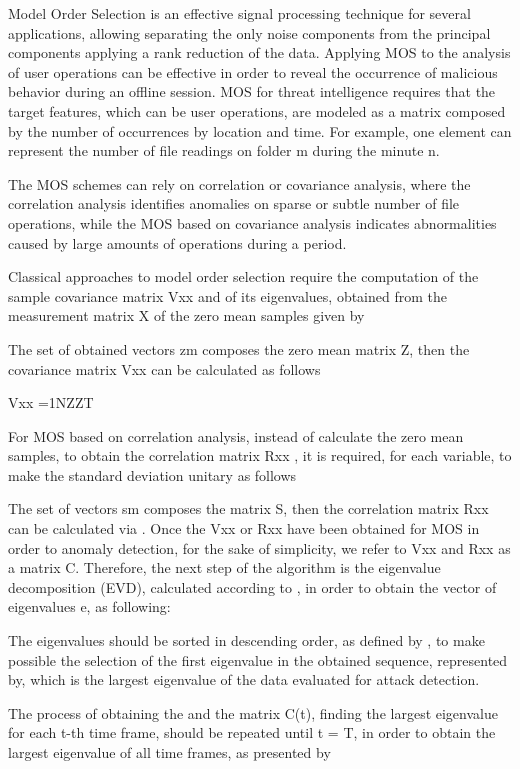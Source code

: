 \documentclass[twocolumn]{svjour3}          %
\begin{document}
Model Order Selection is an effective signal processing technique for several applications, allowing separating the only noise components from the principal components applying a rank reduction of the data. Applying MOS to the analysis of user operations can be effective in order to reveal the occurrence of malicious behavior during an offline session. MOS for threat intelligence requires that the target features, which can be user operations, are modeled as a matrix composed by the number of occurrences by location and time. For example, one element can represent the number of file readings on folder m during the minute n.

The MOS schemes can rely on correlation or covariance analysis, where the correlation analysis identifies anomalies on sparse or subtle number of file operations, while the MOS based on covariance analysis indicates abnormalities caused by large amounts of operations during a period.

Classical approaches to model order selection require the computation of the sample covariance matrix Vxx and of its eigenvalues, obtained from the measurement matrix X of the zero mean samples given by



The set of obtained vectors zm composes the zero mean matrix Z, then the covariance matrix Vxx can be calculated as follows 

Vxx =1NZZT

For MOS based on correlation analysis, instead of calculate the zero mean samples, to obtain the correlation matrix Rxx , it is required, for each variable, to make the standard deviation unitary as follows



The set of vectors sm composes the matrix S, then the correlation matrix Rxx can be calculated via 
. Once the Vxx or Rxx have been obtained for MOS in order to anomaly detection, for the sake of simplicity, we refer to Vxx and Rxx as a matrix C. Therefore, the next step of the algorithm is the eigenvalue decomposition (EVD), calculated according to , in order to obtain the vector of eigenvalues e, as following:



The eigenvalues should be sorted in descending order, as defined by , to make possible the selection of the first eigenvalue in the obtained sequence, represented by, which is the largest eigenvalue of the data evaluated for attack detection.

The process of obtaining the and the matrix C(t), finding the largest eigenvalue for each t-th time frame, should be repeated until t = T, in order to obtain the largest eigenvalue of all time frames, as presented by 
\end{document}
